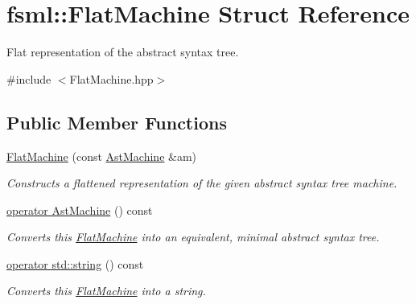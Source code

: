 \hypertarget{structfsml_1_1FlatMachine}{\section{fsml\-:\-:Flat\-Machine Struct Reference}
\label{structfsml_1_1FlatMachine}
}


Flat representation of the abstract syntax tree.  




{\ttfamily \#include $<$Flat\-Machine.\-hpp$>$}

\subsection*{Public Member Functions}
\begin{DoxyCompactItemize}
\item 
\hyperlink{structfsml_1_1FlatMachine_a939aa63ea93b644c498cf2e31f67499f}{Flat\-Machine} (const \hyperlink{structfsml_1_1AstMachine}{Ast\-Machine} \&am)
\begin{DoxyCompactList}\small\item\em Constructs a flattened representation of the given abstract syntax tree machine. \end{DoxyCompactList}\item 
\hyperlink{structfsml_1_1FlatMachine_a79e252b2ba388c1064d9570a6df275af}{operator Ast\-Machine} () const 
\begin{DoxyCompactList}\small\item\em Converts this \hyperlink{structfsml_1_1FlatMachine}{Flat\-Machine} into an equivalent, minimal abstract syntax tree. \end{DoxyCompactList}\item 
\hyperlink{structfsml_1_1FlatMachine_a3c50e3140f7629c8c34f2c760522203b}{operator std\-::string} () const 
\begin{DoxyCompactList}\small\item\em Converts this \hyperlink{structfsml_1_1FlatMachine}{Flat\-Machine} into a string. \end{DoxyCompactList}\end{DoxyCompactItemize}

